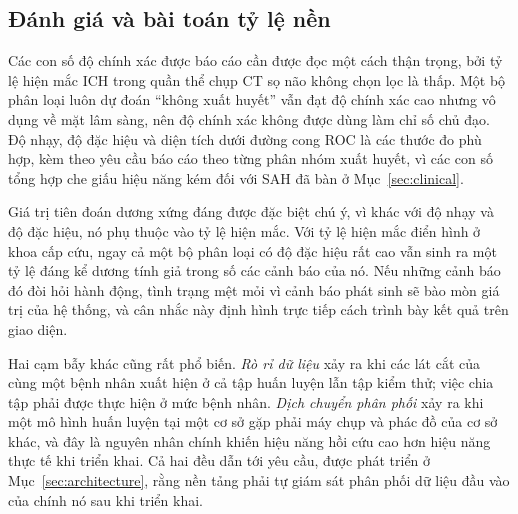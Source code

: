 \subsection{Đánh giá và bài toán tỷ lệ nền}

Các con số độ chính xác được báo cáo cần được đọc một cách thận trọng, bởi tỷ lệ
hiện mắc ICH trong quần thể chụp CT sọ não không chọn lọc là thấp. Một bộ phân
loại luôn dự đoán ``không xuất huyết'' vẫn đạt độ chính xác cao nhưng vô dụng về
mặt lâm sàng, nên độ chính xác không được dùng làm chỉ số chủ đạo. Độ nhạy, độ
đặc hiệu và diện tích dưới đường cong ROC là các thước đo phù hợp, kèm theo yêu
cầu báo cáo theo từng phân nhóm xuất huyết, vì các con số tổng hợp che giấu hiệu
năng kém đối với SAH đã bàn ở Mục~\ref{sec:clinical}.

Giá trị tiên đoán dương xứng đáng được đặc biệt chú ý, vì khác với độ nhạy và độ
đặc hiệu, nó phụ thuộc vào tỷ lệ hiện mắc. Với tỷ lệ hiện mắc điển hình ở khoa
cấp cứu, ngay cả một bộ phân loại có độ đặc hiệu rất cao vẫn sinh ra một tỷ lệ
đáng kể dương tính giả trong số các cảnh báo của nó. Nếu những cảnh báo đó đòi
hỏi hành động, tình trạng mệt mỏi vì cảnh báo phát sinh sẽ bào mòn giá trị của hệ
thống, và cân nhắc này định hình trực tiếp cách trình bày kết quả trên giao diện.

Hai cạm bẫy khác cũng rất phổ biến. \emph{Rò rỉ dữ liệu} xảy ra khi các lát cắt
của cùng một bệnh nhân xuất hiện ở cả tập huấn luyện lẫn tập kiểm thử; việc chia
tập phải được thực hiện ở mức bệnh nhân. \emph{Dịch chuyển phân phối} xảy ra khi
một mô hình huấn luyện tại một cơ sở gặp phải máy chụp và phác đồ của cơ sở khác,
và đây là nguyên nhân chính khiến hiệu năng hồi cứu cao hơn hiệu năng thực tế khi
triển khai. Cả hai đều dẫn tới yêu cầu, được phát triển ở
Mục~\ref{sec:architecture}, rằng nền tảng phải tự giám sát phân phối dữ liệu đầu
vào của chính nó sau khi triển khai.
